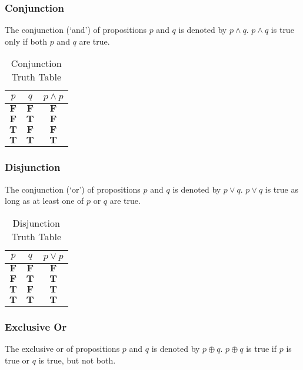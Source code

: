 \subsubsection{Conjunction}
The conjunction (`and') of propositions \(p\) and \(q\) is denoted by \(p \land q\). \(p \land q\) is true only if both \(p\) and \(q\) are true.

\begin{table}[htbp]
    \centering
    \begin{tabular}{ccc}
        \toprule
        \(p\)          & \(q\)          & \(p \land p\)  \\
        \midrule
        \(\mathbf{F}\) & \(\mathbf{F}\) & \(\mathbf{F}\) \\
        \(\mathbf{F}\) & \(\mathbf{T}\) & \(\mathbf{F}\) \\
        \(\mathbf{T}\) & \(\mathbf{F}\) & \(\mathbf{F}\) \\
        \(\mathbf{T}\) & \(\mathbf{T}\) & \(\mathbf{T}\) \\
        \bottomrule
    \end{tabular}
    \caption{Conjunction Truth Table}
\end{table}

\subsubsection{Disjunction}
The conjunction (`or') of propositions \(p\) and \(q\) is denoted by \(p \lor q\). \(p \lor q\) is true as long as at least one of \(p\) or \(q\) are true.

\begin{table}[htbp]
    \centering
    \begin{tabular}{ccc}
        \toprule
        \(p\)          & \(q\)          & \(p \lor p\)   \\
        \midrule
        \(\mathbf{F}\) & \(\mathbf{F}\) & \(\mathbf{F}\) \\
        \(\mathbf{F}\) & \(\mathbf{T}\) & \(\mathbf{T}\) \\
        \(\mathbf{T}\) & \(\mathbf{F}\) & \(\mathbf{T}\) \\
        \(\mathbf{T}\) & \(\mathbf{T}\) & \(\mathbf{T}\) \\
        \bottomrule
    \end{tabular}
    \caption{Disjunction Truth Table}
\end{table}

\subsubsection{Exclusive Or}
The exclusive or of propositions \(p\) and \(q\) is denoted by \(p \oplus q\). \(p \oplus q\) is true if \(p\) is true or \(q\) is true, but not both.

